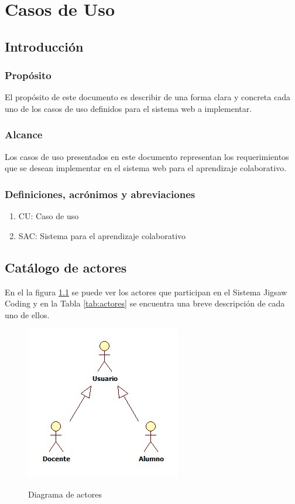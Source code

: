 \chapter{Casos de Uso}\label{apendice.A}
\section{Introducción}
\subsection{Propósito}
El propósito de este documento es describir de una forma clara y concreta cada uno de los casos de uso definidos para el sistema web a implementar.
\subsection{Alcance}
Los casos de uso presentados en este documento representan los requerimientos que se desean implementar en el sistema web para el aprendizaje colaborativo.
\subsection{Definiciones, acrónimos y abreviaciones}
\begin{enumerate}
  \item CU: Caso de uso
  \item SAC: Sistema para el aprendizaje colaborativo
\end{enumerate}
\clearpage
\section{Catálogo de actores}
En el la figura \ref{fig:actores} se puede ver los actores que participan en el Sistema Jigsaw Coding y en la Tabla \ref{tab:actores} se encuentra una breve descripción de cada uno de ellos.
\begin{figure}
  \centering
  \includegraphics[scale=0.6]{figuras/casosdeuso/actores.jpg}\\
  \caption[Diagrama de actores]{Diagrama de actores}
  \label{fig:actores}
\end{figure}

